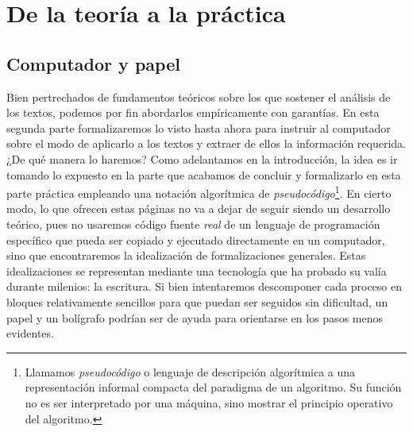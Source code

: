 \chapter{De la teoría a la práctica}\label{chap:B1}
\section{Computador y papel}
Bien pertrechados de fundamentos teóricos sobre los que sostener el análisis de los textos, podemos por fin abordarlos empíricamente con garantías. En esta segunda parte formalizaremos lo visto hasta ahora para instruir al computador sobre el modo de aplicarlo a los textos y extraer de ellos la información requerida. ¿De qué manera lo haremos? Como adelantamos en la introducción, la idea es ir tomando lo expuesto en la parte que acabamos de concluir y formalizarlo en esta parte práctica empleando una notación algorítmica de \textit{pseudocódigo}\footnote{Llamamos \textit{pseudocódigo} o lenguaje de descripción algorítmica a una representación informal compacta del paradigma de un algoritmo. Su función no es ser interpretado por una máquina, sino mostrar el principio operativo del algoritmo.}. En cierto modo, lo que ofrecen estas páginas no va a dejar de seguir siendo un desarrollo teórico, pues no usaremos código fuente \textit{real} de un lenguaje de programación específico que pueda ser copiado y ejecutado directamente en un computador, sino que encontraremos la idealización de formalizaciones generales. Estas idealizaciones se representan mediante una tecnología que ha probado su valía durante milenios: la escritura. Si bien intentaremos descomponer cada proceso en bloques relativamente sencillos para que puedan ser seguidos sin dificultad, un papel y un bolígrafo podrían ser de ayuda para orientarse en los pasos menos evidentes. 


